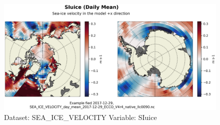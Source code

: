 \begin{figure}[H]
\centering
\includegraphics[scale=0.55]{../images/plots/native_plots/Sea-Ice_Velocity/SIuice.png}
\caption{Dataset: SEA\_ICE\_VELOCITY Variable: SIuice}
\label{tab:table-SEA_ICE_VELOCITY_SIuice-Plot}
\end{figure}
\pagebreak
